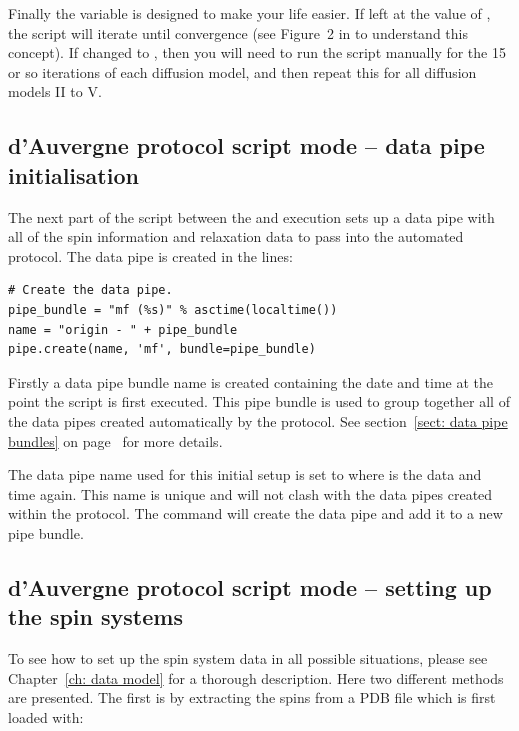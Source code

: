 \begin{htmlonly}
\begin{htmlonly}
Finally the  variable is designed to make your life easier.  If left at the value of , the script will iterate until convergence (see Figure~2 in \citet{dAuvergneGooley08b} to understand this concept).  If changed to , then you will need to run the script manually for the 15 or so iterations of each diffusion model, and then repeat this for all diffusion models II to V.



\subsection{d'Auvergne protocol script mode -- data pipe initialisation}

The next part of the script between the  and execution sets up a data pipe with all of the spin information and relaxation data to pass into the automated protocol.  The data pipe is created in the lines:

\begin{lstlisting}[firstnumber=156]
# Create the data pipe.
pipe_bundle = "mf (%s)" % asctime(localtime())
name = "origin - " + pipe_bundle
pipe.create(name, 'mf', bundle=pipe_bundle)
\end{lstlisting}

Firstly a data pipe bundle name is created containing the date and time at the point the script is first executed.  This pipe bundle is used to group together all of the data pipes created automatically by the protocol.  See section~\ref{sect: data pipe bundles} on page~\pageref{sect: data pipe bundles} for more details.

The data pipe name used for this initial setup is set to  where  is the data and time again.  This name is unique and will not clash with the data pipes created within the protocol.  The  command will create the data pipe and add it to a new pipe bundle.



\subsection{d'Auvergne protocol script mode -- setting up the spin systems}

To see how to set up the spin system data in all possible situations, please see Chapter~\ref{ch: data model} for a thorough description.  Here two different methods are presented.  The first is by extracting the spins from a PDB file which is first loaded with:


\end{htmlonly}
\end{htmlonly}
